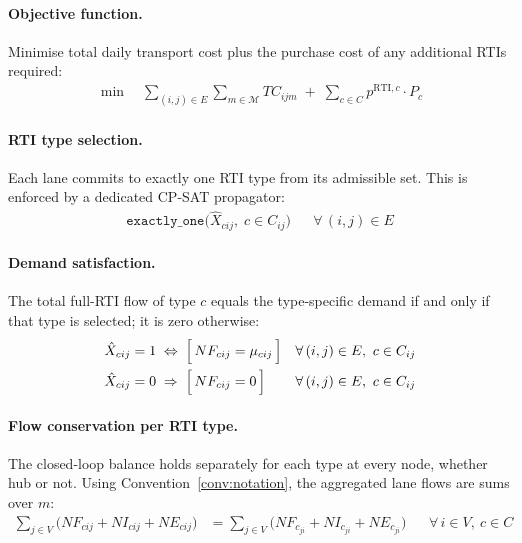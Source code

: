 \paragraph{Objective function.}
Minimise total daily transport cost plus the purchase cost of any
additional RTIs required:
%
\begin{align}
  \min \quad
  \sum_{(i,j)\in E}\sum_{m\in\mathcal{M}} TC_{ijm}
  \;+\;
  \sum_{c\in C} p^{\text{RTI},c} \cdot P_{c}
  \label{eq:objective}
\end{align}


\paragraph{RTI type selection.}
Each lane commits to exactly one RTI type from its admissible set.
This is enforced by a dedicated CP-SAT propagator:
%
\begin{align}
  \texttt{exactly\_one}\bigl(\hat{X}_{cij},\; c \in C_{ij}\bigr)
  && \forall\,(i,j) \in E
  \label{eq:type-selection}
\end{align}


\paragraph{Demand satisfaction.}
The total full-RTI flow of type $c$ equals the type-specific
demand if and only if that type is selected; it is zero otherwise:
%
\begin{align}
  \hat{X}_{cij} = 1
    &\;\Leftrightarrow\;
    \Bigl[\,NF_{cij} = \mu_{cij}\,\Bigr]
  && \forall\,(i,j)\in E,\ c\in C_{ij}
  \label{eq:demand-on}\\
  \hat{X}_{cij} = 0
    &\;\Rightarrow\;
    \Bigl[\,NF_{cij} = 0\,\Bigr]
  && \forall\,(i,j)\in E,\ c\in C_{ij}
  \label{eq:demand-off}
\end{align}


\paragraph{Flow conservation per RTI type.}
The closed-loop balance holds separately for each type at every
node, whether hub or not. Using Convention~\ref{conv:notation},
the aggregated lane flows are sums over $m$:
%
\begin{align}
  \sum_{j\in V}\!\bigl(NF_{cij}+NI_{cij}+NE_{cij}\bigr)
  &=
  \sum_{j\in V}\!\bigl(NF_{c}_{ji}+NI_{c}_{ji}+NE_{c}_{ji}\bigr)
  && \forall\, i\in V,\ c\in C
  \label{eq:conservation}
\end{align}

